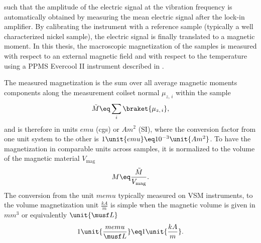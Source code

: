 \documentclass[\main/dresen_thesis.tex]{subfiles}
\begin{document}
    such that the amplitude of the electric signal at the vibration frequency is automatically obtained by measuring the mean electric signal after the lock-in amplifier.
    By calibrating the instrument with a reference sample (typically a well characterized nickel sample), the electric signal is finally translated to a magnetic moment.
    In this thesis, the macroscopic magnetization of the samples is measured with respect to an external magnetic field and with respect to the temperature using a PPMS Evercool II instrument described in .

    The measured magnetization is the sum over all average magnetic moments components along the measurement coilset normal $\mu_{z,\,i}$  within the sample
    \begin{align}
      \tilde{M} \eq \sum_i \braket{\mu_{z,\,i}},
    \end{align}
    and is therefore in units $\unit{emu}$ (cgs) or $\unit{Am^2}$ (SI), where the conversion factor from one unit system to the other is $1 \unit{emu} \eq 10^{-3} \unit{Am^2}$.
    To have the magnetization in comparable units across samples, it is normalized to the volume of the magnetic material $V_\mathrm{mag}$
    \begin{align}
      M \eq \frac{\tilde{M}}{V_\mathrm{mag}}.
    \end{align}
    The conversion from the unit $\unit{memu}$ typically measured on VSM instruments, to the volume magnetization unit $\unit{\frac{kA}{m}}$ is simple when the magnetic volume is given in $\unit{mm^3}$ or equivalently $\unit{\musf L}$
    \begin{align}
      1 \unit{\frac{memu}{\musf L}} \eq 1 \unit{\frac{kA}{m}}.
    \end{align}
\end{document}
